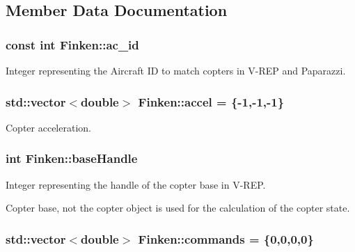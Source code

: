 \subsection{Member Data Documentation}
\subsubsection[{\texorpdfstring{ac\+\_\+id}{ac_id}}]{\setlength{\rightskip}{0pt plus 5cm}const int Finken\+::ac\+\_\+id}\hypertarget{classFinken_a496f5024f0876710ca1cfd55a2924e85}{}\label{classFinken_a496f5024f0876710ca1cfd55a2924e85}


Integer representing the Aircraft ID to match copters in V-\/\+R\+EP and Paparazzi. 

\subsubsection[{\texorpdfstring{accel}{accel}}]{\setlength{\rightskip}{0pt plus 5cm}std\+::vector$<$double$>$ Finken\+::accel = \{-\/1,-\/1,-\/1\}}\hypertarget{classFinken_a6f9723479baee5573447036270a2a722}{}\label{classFinken_a6f9723479baee5573447036270a2a722}


Copter acceleration. 

\subsubsection[{\texorpdfstring{base\+Handle}{baseHandle}}]{\setlength{\rightskip}{0pt plus 5cm}int Finken\+::base\+Handle}\hypertarget{classFinken_aef4736605ea21831e5340f66a931f8ac}{}\label{classFinken_aef4736605ea21831e5340f66a931f8ac}


Integer representing the handle of the copter base in V-\/\+R\+EP. 

Copter base, not the copter object is used for the calculation of the copter state. 
\subsubsection[{\texorpdfstring{commands}{commands}}]{\setlength{\rightskip}{0pt plus 5cm}std\+::vector$<$double$>$ Finken\+::commands = \{0,0,0,0\}}\hypertarget{classFinken_aa4fe546d88b52ff92990bd67ced70567}{}\label{classFinken_aa4fe546d88b52ff92990bd67ced70567}


